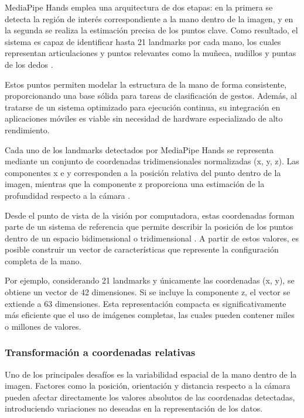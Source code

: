 	MediaPipe Hands emplea una arquitectura de dos etapas: en la primera se detecta la región de interés correspondiente a la mano dentro de la imagen, y en la segunda se realiza la estimación precisa de los puntos clave. Como resultado, el sistema es capaz de identificar hasta 21 landmarks por cada mano, los cuales representan articulaciones y puntos relevantes como la muñeca, nudillos y puntas de los dedos \cite{zhang2020mediapipehands}.
	
	Estos puntos permiten modelar la estructura de la mano de forma consistente, proporcionando una base sólida para tareas de clasificación de gestos. Además, al tratarse de un sistema optimizado para ejecución continua, su integración en aplicaciones móviles es viable sin necesidad de hardware especializado de alto rendimiento.
	
	Cada uno de los landmarks detectados por MediaPipe Hands se representa mediante un conjunto de coordenadas tridimensionales normalizadas (x, y, z). Las componentes x e y corresponden a la posición relativa del punto dentro de la imagen, mientras que la componente z proporciona una estimación de la profundidad respecto a la cámara \cite{mediapipe_hands}.
	
	Desde el punto de vista de la visión por computadora, estas coordenadas forman parte de un sistema de referencia que permite describir la posición de los puntos dentro de un espacio bidimensional o tridimensional \cite{szeliski2010computer}. A partir de estos valores, es posible construir un vector de características que represente la configuración completa de la mano.
	
	Por ejemplo, considerando 21 landmarks y únicamente las coordenadas (x, y), se obtiene un vector de 42 dimensiones. Si se incluye la componente z, el vector se extiende a 63 dimensiones. Esta representación compacta es significativamente más eficiente que el uso de imágenes completas, las cuales pueden contener miles o millones de valores.
	
	\subsubsection{Transformación a coordenadas relativas}
	
	Uno de los principales desafíos es la variabilidad espacial de la mano dentro de la imagen. Factores como la posición, orientación y distancia respecto a la cámara pueden afectar directamente los valores absolutos de las coordenadas detectadas, introduciendo variaciones no deseadas en la representación de los datos.
	
